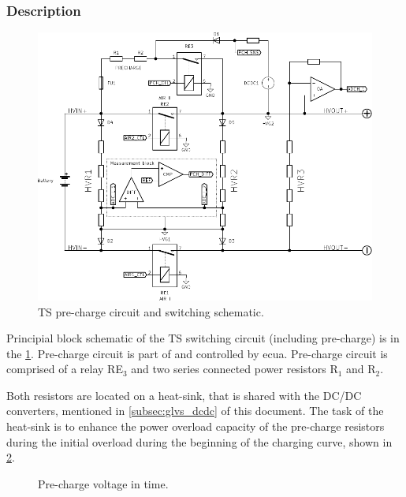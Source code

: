 \subsubsection{Description}

\begin{figure}[H]
	\centering
	\includegraphics[width=\textwidth,clip]{./img/ECUA_AIRS.pdf}
	\caption{TS pre-charge circuit and switching schematic.}
	\label{fig:precharge_sch}
\end{figure}

Principial block schematic of the TS switching circuit (including pre-charge) is in the \ref{fig:precharge_sch}. Pre-charge circuit is part of and controlled by \gls{ecua}. Pre-charge circuit is comprised of a relay RE$_3$ and two series connected power resistors R$_1$ and R$_2$. 

Both resistors are located on a heat-sink, that is shared with the DC/DC converters, mentioned in \ref{subsec:glvs_dcdc} of this document. The task of the heat-sink is to enhance the power overload capacity of the pre-charge resistors during the initial overload during the beginning of the charging curve, shown in \ref{fig:precharge_voltage_time}.

\begin{figure}
		\caption{Pre-charge voltage in time.}
	\label{fig:precharge_voltage_time}
\end{figure}

